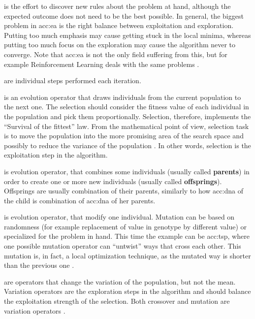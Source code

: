  is the effort to discover new rules about the problem at hand, although the expected outcome does not need to be the best possible. In general, the biggest problem in \acrshort{acc:ea} is the right balance between exploitation and exploration. Putting too much emphasis may cause getting stuck in the local minima, whereas putting too much focus on the exploration may cause the algorithm never to converge. Note that \acrshort{acc:ea} is not the only field suffering from this, but for example Reinforcement Learning deals with the same problems \citep{ExplorationExploitationDilemaRL}. 

 are individual steps performed each iteration.

 is an evolution operator that draws individuals from the current population to the next one. The selection should consider the fitness value of each individual in the population and pick them proportionally. Selection, therefore, implements the \enquote{Survival of the fittest} law. From the mathematical point of view, selection task is to move the population into the more promising area of the search space and possibly to reduce the variance of the population \citep{SelfAdaptiveFeaturesInRealParameterEvolutionaryAlgorithms}. In other words, selection is the exploitation step in the algorithm.

 is evolution operator, that combines some individuals (usually called \textbf{parents}) in order to create one or more new individuals (usually called \textbf{offsprings}). Offsprings are usually combination of their parents, similarly to how \acrshort{acc:dna} of the child is combination of \acrshort{acc:dna} of her parents.

 is evolution operator, that modify one individual. Mutation can be based on randomness (for example replacement of value in genotype by different value) or specialized for the problem in hand. This time the example can be \acrlong{acc:tsp}, where one possible mutation operator can \enquote{untwist} ways that cross each other. This mutation is, in fact, a local optimization technique, as the mutated way is shorter than the previous one \citep{TSPArticle}.

 are operators that change the variation of the population, but not the mean. Variation operators are the exploration steps in the algorithm and should balance the exploitation strength of the selection. Both crossover and mutation are variation operators \citep{SelfAdaptiveFeaturesInRealParameterEvolutionaryAlgorithms}.

